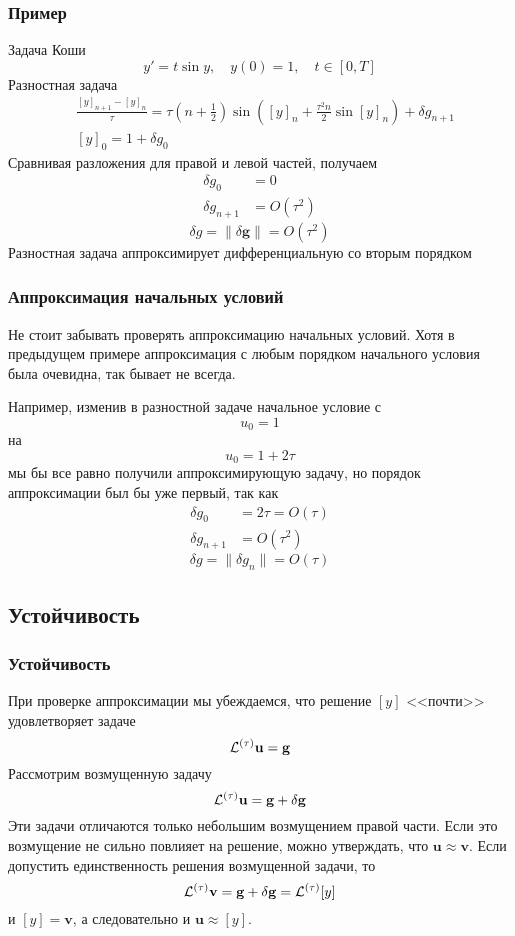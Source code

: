 \documentclass[apectratio=43,unicode]{beamer}
\begin{document}
\begin{frame}\frametitle{Пример}
	Задача Коши
	$$
	y' = t \sin y, \quad y(0) = 1, \quad t \in [0, T]
	$$
	Разностная задача
	\begin{align*}
	&\frac{[y]_{n+1} - [y]_n}{\tau} = \tau\left(n+\frac{1}{2}\right)\sin\left([y]_n + \frac{\tau^2 n}{2} 
		\sin [y]_n\right) + \delta g_{n+1}\\
	&[y]_0 = 1 + \delta g_0
	\end{align*}
	Сравнивая разложения для правой и левой частей, получаем
	\begin{align*}
	\delta g_0 &= 0\\
	\delta g_{n+1} &= O(\tau^2)
	\end{align*}
	$$
	\delta g = \|\delta \mathbf{g}\| = O(\tau^2)
	$$
	Разностная задача аппроксимирует дифференциальную со вторым порядком
\end{frame}

\begin{frame}\frametitle{Аппроксимация начальных условий}
	Не стоит забывать проверять аппроксимацию начальных условий. Хотя в предыдущем примере 
	аппроксимация с любым порядком начального условия была очевидна, так бывает не всегда.
	
	Например, изменив в разностной задаче начальное условие с 
	$$
	u_0 = 1
	$$
	на
	$$
	u_0 = 1+2\tau
	$$
	мы бы все равно получили аппроксимирующую задачу, но порядок аппроксимации был бы уже первый, так как
	\begin{align*}
	\delta g_0 &= 2\tau = O(\tau)\\
	\delta g_{n+1} &= O(\tau^2)
	\end{align*}
	$$
	\delta g = \|\delta g_n\| = O(\tau)
	$$
\end{frame}

\subsection{Устойчивость}
\begin{frame}\frametitle{Устойчивость}
	При проверке аппроксимации мы убеждаемся, что решение $[y]$ <<почти>> удовлетворяет задаче
	$$
	{\mathcal{L}^{(\tau)}} \mathbf{u} = \mathbf{g}
	$$
	Рассмотрим возмущенную задачу
	$$
	{\mathcal{L}^{(\tau)}} \mathbf{u} = \mathbf{g} + \delta \mathbf{g}
	$$
	Эти задачи отличаются только небольшим возмущением правой части. Если это возмущение не сильно повлияет
	на решение, можно утверждать, что $\mathbf{u} \approx \mathbf{v}$. Если допустить единственность 
	решения возмущенной задачи, то
	$$
	{\mathcal{L}^{(\tau)}} \mathbf{v} = \mathbf{g} + \delta \mathbf{g} = {\mathcal{L}^{(\tau)}} [y]
	$$
	и $[y] = \mathbf{v}$, а следовательно и $\mathbf{u} \approx [y]$.
\end{frame}
\end{document}

